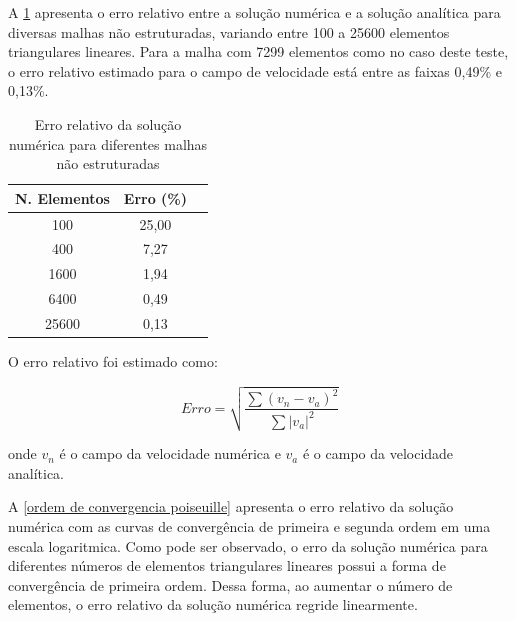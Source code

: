 \newpage
A \ref{erro relativo poiseuille tabela} apresenta o erro relativo
entre a solução numérica e a solução analítica para diversas malhas
não estruturadas, variando entre 100 a 25600 elementos triangulares lineares.
Para a malha com 7299 elementos como no caso deste teste, o erro relativo estimado para o campo de
velocidade está entre as faixas 0,49\% e 0,13\%. 

\vspace{0.5cm}
\begin{table}[H]
\centering
\begin{tabular}{ccc}
\toprule
\textbf{N. Elementos} & \textbf{Erro} (\%) \\
\midrule
100 & 25,00 \\
400 & 7,27 \\
1600 & 1,94 \\
6400 & 0,49 \\
25600 & 0,13 \\
\bottomrule
\end{tabular}
\caption{Erro relativo da solução numérica para diferentes malhas não estruturadas}
\label{erro relativo poiseuille tabela}
\end{table}

\noindent
\medskip
O erro relativo foi estimado como:

\begin{equation}
 \mathit{Erro} = \sqrt{\frac{\sum{(v_{n} - v_{a})^{2} }}{\sum |v_{a}|^{2} }}
\end{equation}

\noindent
onde $v_{n}$ é o campo da velocidade numérica e $v_{a}$ é o campo
da velocidade analítica. 



\newpage
A \ref{ordem de convergencia poiseuille} apresenta o erro
relativo da solução numérica com as curvas de convergência de primeira e segunda ordem em uma
escala logaritmica. Como pode ser observado, o erro da solução numérica para diferentes números
de elementos triangulares lineares possui a forma de convergência de primeira ordem.
Dessa forma, ao aumentar o número de elementos, o erro relativo da solução numérica
regride linearmente.


